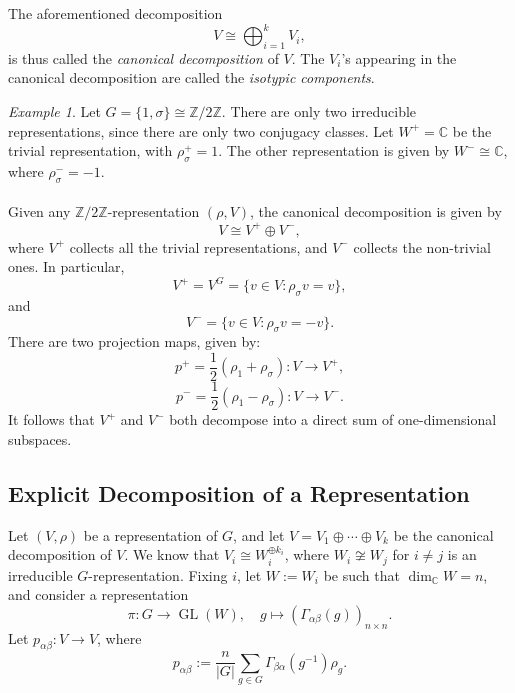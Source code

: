 \documentclass[a4paper]{report}
\theoremstyle{definition}
\theoremstyle{remark}
\theoremstyle{proposition}
\theoremstyle{conjecture}
\theoremstyle{lemma}
\theoremstyle{corollary}
\theoremstyle{exercise}
\theoremstyle{example}
\newtheorem{example}{Example}
\newcommand{\C}{\mathbb{C}}
\newcommand{\on}{\operatorname}
\begin{document}
The aforementioned decomposition $$V \cong \bigoplus_{i=1}^kV_i,$$
is thus called the \emph{canonical decomposition} of $V$. The 
$V_i$'s appearing in the canonical decomposition are called the 
\emph{isotypic components}.

\begin{example}
    Let $G = \lbrace 1,\sigma\rbrace \cong \mathbb{Z}/2\mathbb{Z}$.
    There are only two irreducible representations, since there are only 
    two conjugacy classes. Let $W^+ = \C$ be the trivial representation,
    with $\rho_\sigma^+ = 1$. The other representation is given by
     $W^- \cong \C$, where $\rho_\sigma^- = -1$.\\\\
     Given any $\mathbb{Z}/2\mathbb{Z}$-representation $(\rho,V)$, 
     the canonical decomposition is given by 
     $$V \cong V^+ \oplus V^-,$$
     where $V^+$ collects all the trivial representations, and 
     $V^-$ collects the non-trivial ones. 
     In particular, 
     $$V^+ = V^G = \lbrace v \in V : \rho_\sigma v = v\rbrace,$$
     and $$V^- = \lbrace v\in V:  \rho_\sigma v = -v\rbrace.$$
     There are two projection maps, given by: 
     $$p^+ = \frac{1}{2}(\rho_1 + \rho_\sigma) : V \longrightarrow V^+,$$ 
     $$p^- = \frac{1}{2}(\rho_1-\rho_\sigma):  V\longrightarrow V^-.$$
     It follows that $V^+$ and $V^-$ both decompose into a direct sum of 
     one-dimensional subspaces.
\end{example}

\subsection{Explicit Decomposition of a Representation}

Let $(V,\rho)$ be a representation of $G$, and let 
$V = V_1\oplus\cdots\oplus V_k$ be the canonical decomposition of $V$.
We know that $V_i \cong W_i^{\oplus k_i}$, where $W_i \not\cong W_j$
for $i \neq j$ is an irreducible $G$-representation.
Fixing $i$, let $W := W_i$ be such that $\dim_\C W = n$, 
and consider a representation 
$$\pi : G \longrightarrow \on{GL}(W),\quad g\longmapsto (\Gamma_{\alpha\beta}(g))_{n\times n}.$$
Let $p_{\alpha\beta}: V \to V$, where $$p_{\alpha\beta} := \frac{n}{\vert G \vert}\sum_{g \in G} \Gamma_{\beta\alpha}(g^{-1})\rho_g.$$
\end{document}
